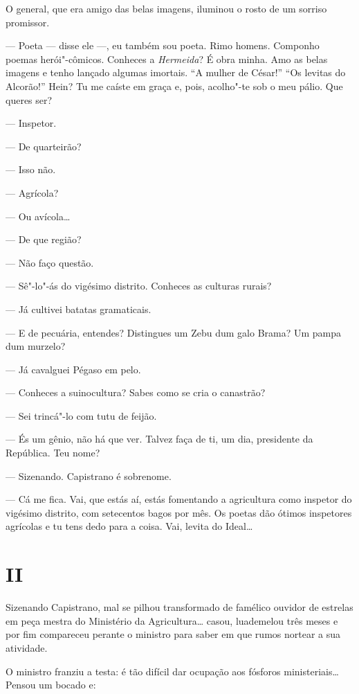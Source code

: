 O general, que era amigo das belas imagens, iluminou o rosto de um
sorriso promissor.

--- Poeta --- disse ele ---, eu também sou poeta. Rimo homens. Componho
poemas herói"-cômicos. Conheces a \emph{Hermeida}? É obra minha. Amo as
belas imagens e tenho lançado algumas imortais. ``A mulher de César!''
``Os levitas do Alcorão!'' Hein? Tu me caíste em graça e, pois,
acolho"-te sob o meu pálio. Que queres ser?

--- Inspetor.

--- De quarteirão?

--- Isso não.

--- Agrícola?

--- Ou avícola\ldots{}

--- De que região?

--- Não faço questão.

--- Sê"-lo"-ás do vigésimo distrito. Conheces as culturas rurais?

--- Já cultivei batatas gramaticais.

--- E de pecuária, entendes? Distingues um Zebu dum galo Brama? Um pampa
dum murzelo?

--- Já cavalguei Pégaso em pelo.

--- Conheces a suinocultura? Sabes como se cria o canastrão?

--- Sei trincá"-lo com tutu de feijão.

--- És um gênio, não há que ver. Talvez faça de ti, um dia, presidente
da República. Teu nome?

--- Sizenando. Capistrano é sobrenome.

--- Cá me fica. Vai, que estás aí, estás fomentando a agricultura como
inspetor do vigésimo distrito, com setecentos bagos por mês. Os poetas
dão ótimos inspetores agrícolas e tu tens dedo para a coisa. Vai, levita
do Ideal\ldots{}

\section*{II}

Sizenando Capistrano, mal se pilhou transformado de famélico ouvidor de
estrelas em peça mestra do Ministério da Agricultura\ldots{} casou,
luademelou três meses e por fim compareceu perante o ministro para saber
em que rumos nortear a sua atividade.

O ministro franziu a testa: é tão difícil dar ocupação aos fósforos
ministeriais\ldots{} Pensou um bocado e:


